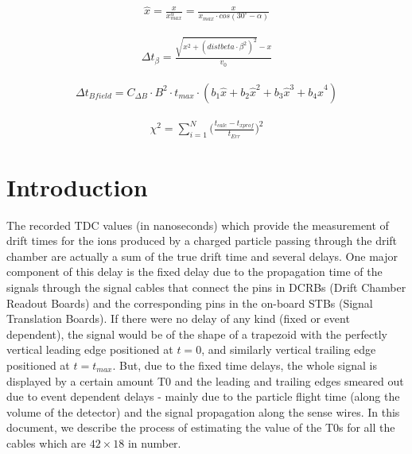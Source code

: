 \documentclass[12pt,epsfig]{article}
\begin{document}
\begin{equation}
\label{xhat}
\begin{aligned}
  \hat{x}   = \frac{x}{x^{\alpha}_{max}} = \frac{x}{x_{max}\cdot cos(30^{\circ} - \alpha)}
\end{aligned}
\end{equation}

\begin{equation}
\label{tBeta}
\begin{aligned}
  \Delta t_{\beta}  = \frac{ \sqrt{x^2 + (distbeta\cdot \beta^2)^2} - x }{v_0}
\end{aligned}
\end{equation}


\begin{equation}
\label{tBfield}
\begin{aligned}
  \Delta t_{Bfield}   = C_{\Delta B}\cdot B^2 \cdot t_{max} \cdot (b_1 \hat{x} + b_2 \hat{x}^2
  + b_3 \hat{x}^3 + b_4 \hat{x}^4)
\end{aligned}
\end{equation}



\begin{equation}
\label{chisq}
\begin{aligned}
  \chi^2   = \sum_{i=1}^{N} \Big(\frac{t_{calc} - t_{xprof}}{t_{Err}} \Big)^2
\end{aligned}
\end{equation}



\section{Introduction}
\FloatBarrier

The recorded TDC values (in nanoseconds) which provide the measurement of drift times for the ions produced by a charged particle passing through the drift chamber are actually a sum of the true drift time and several delays. One major component of this delay is the fixed delay due to the propagation time of the signals through the signal cables that connect the pins in DCRBs (Drift Chamber Readout Boards) and the corresponding pins in the on-board STBs (Signal Translation Boards). If there were no delay of any kind (fixed or event dependent), the signal would be of the shape of a trapezoid with the perfectly vertical leading edge positioned at $t = 0$, and similarly vertical trailing edge positioned at $t = t_{max}$. But, due to the fixed time delays, the whole signal is displayed by a certain amount T0 and the leading and trailing edges smeared out due to event dependent delays - mainly due to the particle flight time (along the volume of the detector) and the signal propagation along the sense wires. In this document, we describe the process of estimating the value of the T0s for all the cables which are $42\times 18$ in number.
\end{document}
